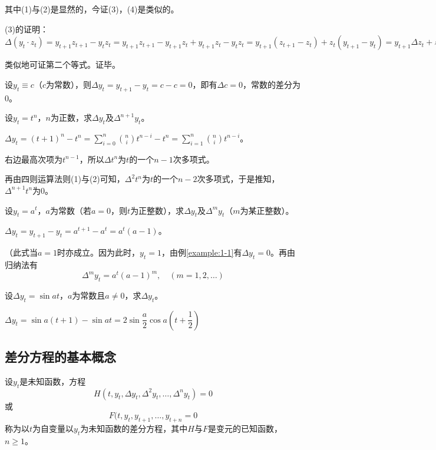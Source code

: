 		其中(1)与(2)是显然的，今证(3)，(4)是类似的。

		(3)的证明：$\Delta(y_t \cdot z_t) = y_{t+1}z_{t+1} - y_tz_t = y_{t+1}z_{t+1}- y_{t+1}z_t + y_{t+1}z_t - y_tz_t = y_{t+1}(z_{t+1} - z_t) + z_t(y_{t+1} - y_t) = y_{t+1} \Delta z_t + z_t \Delta y_t$

		类似地可证第二个等式。证毕。

		\example\label{example:1-1} 设$y_t \equiv c$（$c$为常数），则$\Delta y_t = y_{t+1} - y_t = c - c = 0$，即有$\Delta c = 0$，常数的差分为$0$。

		\example 设$y_t = t^n$，$n$为正数，求$\Delta y_t$及$\Delta ^{n+1} y_t$。

		\answer $\Delta y_t = (t + 1)^n - t^n = \sum ^n_{i=0} \binom{n}{i} t^{n - i} - t^n = \sum^n_{i=1} \binom{n}{i} t^{n - i}$。

		右边最高次项为$t^{n - 1}$，所以$\Delta t^n$为$t$的一个$n - 1$次多项式。

		再由四则运算法则(1)与(2)可知，$\Delta ^2 t^n$为$t$的一个$n - 2$次多项式，于是推知，$\Delta ^{n + 1} t^n$为$0$。

		\example 设$y_t = a^t$，$a$为常数（若$a = 0$，则$t$为正整数），求$\Delta y_t$及$\Delta ^m y_t$（$m$为某正整数）。

		\answer $\Delta y_t = y_{t + 1} - y_t = a^{t + 1} - a^t = a^t(a - 1)$。
		
		（此式当$a = 1$时亦成立。因为此时，$y_t = 1$，由例\ref{example:1-1}有$\Delta y_t = 0$。再由归纳法有$$\Delta ^m y_t = a^t(a - 1)^m, \quad (m = 1,2,\ldots)$$

		\example 设$\Delta y_t = \sin at $，$a$为常数且$a \neq 0$，求$\Delta y_t$。

		\answer $\Delta y_t = \sin a (t + 1) - \sin at  = 2 \sin \dfrac{a}{2}  \cos a (t + \dfrac{1}{2})$

	\subsection{差分方程的基本概念}

		 设$y_t$是未知函数，方程
		\begin{equation}\label{eq:5-2}
			H(t, y_t, \Delta y_t, \Delta ^2 y_t, \ldots, \Delta ^n y_t) = 0
		\end{equation}
		或
		\begin{equation}\label{eq:5-3}
			F(t, y_t, y_{t + 1}, \ldots, y_{t + n} = 0
		\end{equation}
		称为以$t$为自变量以$y_t$为未知函数的{\heiti 差分方程}，其中$H$与$F$是变元的已知函数，$n \geqslant 1$。

